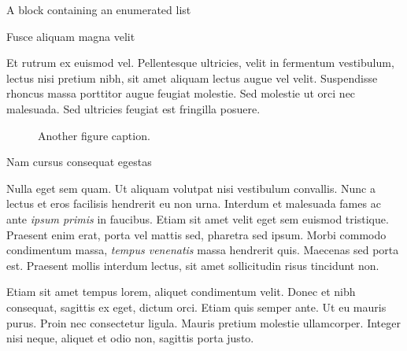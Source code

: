 \documentclass[final]{beamer}
\newlength{\colwidth}
\begin{document}
\begin{frame}[t]
\begin{columns}[t]
\begin{column}{\colwidth}
\begin{block}{A block containing an enumerated list}
      \end{block}

      \begin{block}{Fusce aliquam magna velit}

        Et rutrum ex euismod vel. Pellentesque ultricies, velit in fermentum
        vestibulum, lectus nisi pretium nibh, sit amet aliquam lectus augue vel
        velit. Suspendisse rhoncus massa porttitor augue feugiat molestie. Sed
        molestie ut orci nec malesuada. Sed ultricies feugiat est fringilla
        posuere.

        \begin{figure}
          \centering
          \caption{Another figure caption.}
        \end{figure}

      \end{block}

      \begin{block}{Nam cursus consequat egestas}

        Nulla eget sem quam. Ut aliquam volutpat nisi vestibulum convallis. Nunc a
        lectus et eros facilisis hendrerit eu non urna. Interdum et malesuada fames
        ac ante \textit{ipsum primis} in faucibus. Etiam sit amet velit eget sem
        euismod tristique. Praesent enim erat, porta vel mattis sed, pharetra sed
        ipsum. Morbi commodo condimentum massa, \textit{tempus venenatis} massa
        hendrerit quis. Maecenas sed porta est. Praesent mollis interdum lectus,
        sit amet sollicitudin risus tincidunt non.

        Etiam sit amet tempus lorem, aliquet condimentum velit. Donec et nibh
        consequat, sagittis ex eget, dictum orci. Etiam quis semper ante. Ut eu
        mauris purus. Proin nec consectetur ligula. Mauris pretium molestie
        ullamcorper. Integer nisi neque, aliquet et odio non, sagittis porta justo.


\end{block}
\end{column}
\end{columns}
\end{frame}
\end{document}
